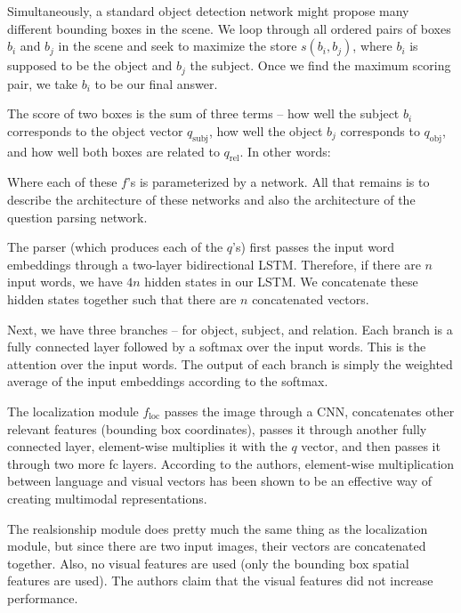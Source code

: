 \documentclass[12pt]{article}
\begin{document}
Simultaneously, a standard object detection network might propose many different bounding boxes in the scene. We loop through all ordered pairs of boxes $b_i$ and $b_j$ in the scene and seek to maximize the store $s(b_i, b_j)$, where $b_i$ is supposed to be the object and $b_j$ the subject. Once we find the maximum scoring pair, we take $b_i$ to be our final answer.

The score of two boxes is the sum of three terms -- how well the subject $b_i$ corresponds to the object vector $q_\text{subj}$, how well the object $b_j$ corresponds to $q_\text{obj}$, and how well both boxes are related to $q_\text{rel}$. In other words:


Where each of these $f$'s is parameterized by a network. All that remains is to describe the architecture of these networks and also the architecture of the question parsing network.

The parser (which produces each of the $q$'s) first passes the input word embeddings through a two-layer bidirectional LSTM. Therefore, if there are $n$ input words, we have $4n$ hidden states in our LSTM. We concatenate these hidden states together such that there are $n$ concatenated vectors.

Next, we have three branches -- for object, subject, and relation. Each branch is a fully connected layer followed by a softmax over the input words. This is the attention over the input words. The output of each branch is simply the weighted average of the input embeddings according to the softmax. 

The localization module $f_\text{loc}$ passes the image through a CNN, concatenates other relevant features (bounding box coordinates), passes it through another fully connected layer, element-wise multiplies it with the $q$ vector, and then passes it through two more fc layers. According to the authors, element-wise multiplication between language and visual vectors has been shown to be an effective way of creating multimodal representations.

The realsionship module does pretty much the same thing as the localization module, but since there are two input images, their vectors are concatenated together. Also, no visual features are used (only the bounding box spatial features are used). The authors claim that the visual features did not increase performance. 
\end{document}
